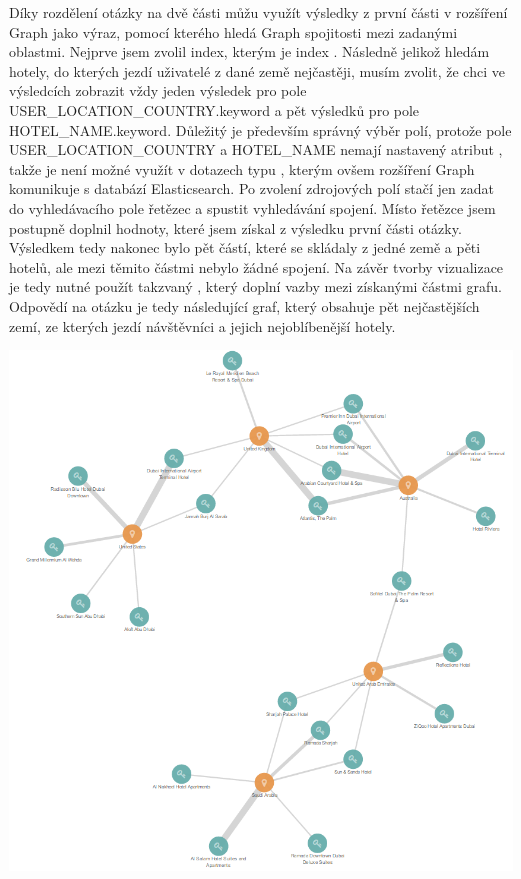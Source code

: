 \documentclass[czech,BP]{thesiskiv}
\begin{document}
Díky rozdělení otázky na dvě části můžu využít výsledky z první části v rozšíření Graph jako výraz, pomocí kterého hledá Graph spojitosti mezi zadanými oblastmi. Nejprve jsem zvolil index, kterým je index . Následně jelikož hledám hotely, do kterých jezdí uživatelé z dané země nejčastěji, musím zvolit, že chci ve výsledcích zobrazit vždy jeden výsledek pro pole USER\_LOCATION\_COUNTRY.keyword a pět výsledků pro pole HOTEL\_NAME.keyword. Důležitý je především správný výběr polí, protože pole USER\_LOCATION\_COUNTRY a HOTEL\_NAME nemají nastavený atribut , takže je není možné využít v dotazech typu , kterým ovšem rozšíření Graph komunikuje s databází Elasticsearch. Po zvolení zdrojových polí stačí jen zadat do vyhledávacího pole řetězec  a spustit vyhledávání spojení. Místo řetězce  jsem postupně doplnil hodnoty, které jsem získal z výsledku první části otázky. Výsledkem tedy nakonec bylo pět částí, které se skládaly z jedné země a pěti hotelů, ale mezi těmito částmi nebylo žádné spojení. Na závěr tvorby vizualizace je tedy nutné použít takzvaný , který doplní vazby mezi získanými částmi grafu. Odpovědí na otázku je tedy následující graf, který obsahuje pět nejčastějších zemí, ze kterých jezdí návštěvníci a jejich nejoblíbenější hotely.
\begin{center}
	\includegraphics[width = \textwidth]{img/5_countries_highest_appearance_graph.png}
\end{center}
\end{document}
